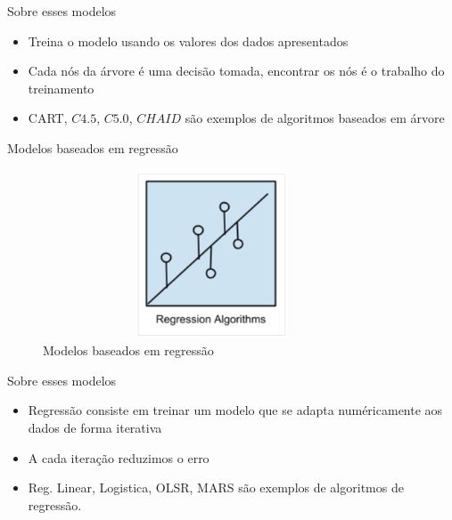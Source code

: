 \begin{frame}	
	\begin{block}{Sobre esses modelos}	
		\begin{itemize}
			\item Treina o modelo usando os valores dos dados apresentados
			\item Cada nós da árvore é uma decisão tomada, encontrar os nós é o trabalho do treinamento
			\item CART, $C4.5$, $C5.0$, $CHAID$ são exemplos de algoritmos baseados em árvore
		\end{itemize}		
	\end{block}
\end{frame}


\begin{frame}	
	\begin{block}{Modelos baseados em regressão}	
		\begin{figure}[!htb]
			\centering	  				
			\includegraphics[height=5cm, width = 10cm]{./pic/regressao.png}
			\caption{Modelos baseados em regressão}
			\label{fig_modelos}
		\end{figure}
	\end{block}
\end{frame}


\begin{frame}	
	\begin{block}{Sobre esses modelos}	
		\begin{itemize}
			\item Regressão consiste em treinar um modelo que se adapta numéricamente aos dados de forma iterativa
			\item A cada iteração reduzimos o erro
			\item Reg. Linear, Logistica, OLSR, MARS são exemplos de algoritmos de regressão.
		\end{itemize}
	\end{block}
\end{frame}


